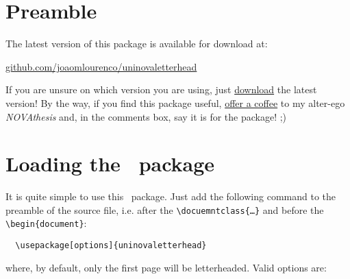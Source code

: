 \documentclass[a4paper,11pt]{article}
\title{\theTitle}
\author{\theAuthor}
\date{\uninovadate\ \ (v.\ \uninovaversion)}
\newcommand*{\thePackage}{\texttt{\uninovaletterheadname}}
\begin{document}
\maketitle


\begin{abstract}
    This document is simultaneously an instruction manual and an example of how to use the \LaTeX\ “\thePackage” package. This package allows you to produce documents on the \emph{letterhead} of \href{www.uninova.pt}{UNINOVA (Institute for the Development of New Technologies)}.
\end{abstract}


\section{Preamble}

The latest version of this package is available for download at:

\begin{center}
  \url{github.com/joaomlourenco/uninovaletterhead}
\end{center}

If you are unsure on which version you are using, just \href{github.com/joaomlourenco/uninovaletterhead/archive/refs/heads/main.zip}{download} the latest version! By the way, if you find this package useful, \href{www.paypal.com/donate/?hosted_button_id=8WA8FRVMB78W8}{offer a coffee} to my alter-ego \emph{NOVAthesis} and, in the comments box, say it is for the \thePackage package! ;)


\section{Loading the \thePackage\ package}

It is quite simple to use this \thePackage\ package. Just add the following command to the preamble of the source file, i.e. after the \verb`\docuemntclass{…}` and before the \verb`\begin{document}`:

\begin{verbatim}
  \usepackage[options]{uninovaletterhead}
\end{verbatim}

\noindent where, by default, only the first page will be letterheaded.
Valid options are:\vspace{-1.5ex}
\end{document}
